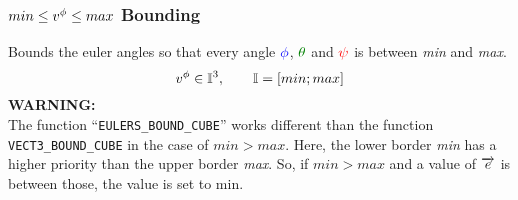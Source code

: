 \subsubsection*{$min \leq \eu v \leq max$ Bounding}
Bounds the euler angles so that every angle $\Roll$, $\Pitch$ and $\Yaw$ is between \textit{min} and \textit{max}.
\begin{equation}
\eu v \in \mathbb{I}^3, \qquad \mathbb{I} = [min; max]
\end{equation}
\textbf{WARNING:}\\
The function  ``\texttt{EULERS\_BOUND\_CUBE}'' works different than the function \texttt{VECT3\_BOUND\_CUBE} in the case of $min > max$. Here, the lower border \textit{min} has a higher priority than the upper border \textit{max}. So, if $ min > max$ and a value of $ \vect e $ is between those, the value is set to min. \\
